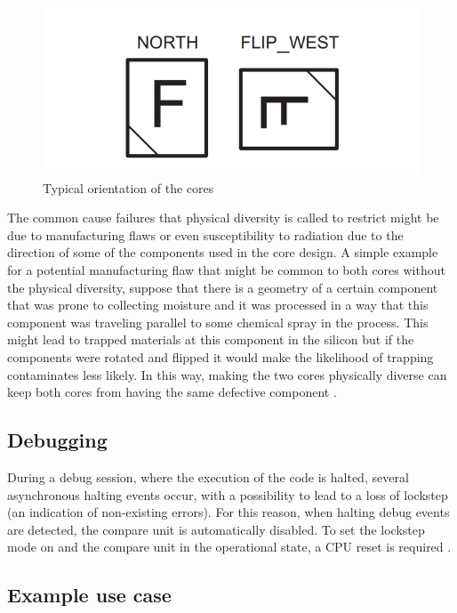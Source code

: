 \begin{figure}[H]

      \centering
      \includegraphics[width=0.8\linewidth]{images/lockstep_cpu_position.png}
      \caption{Typical orientation of the cores \citep{safety_maual_tms570ls31x}}
      \label{fig:lockstep_cpu_position}
    
\end{figure}

The common cause failures
that physical diversity is called to restrict might be due to manufacturing flaws
or even susceptibility to radiation due to the direction of some of the components
used in the core design. A simple example for a potential manufacturing flaw that
might be common to both cores without the physical diversity, suppose that there
is a geometry of a certain component that was prone to collecting moisture and it was processed in a way that this component was traveling parallel to some chemical spray in the process. This might lead to trapped materials at this component
in the silicon but if the components were rotated and flipped it would make the
likelihood of trapping contaminates less likely. In this way, making the two cores
physically diverse can keep both cores from having the same defective component \citep{lockstep_analysis}. 

\subsection{Debugging}

During a debug session, where the execution of the code is halted, several asynchronous halting events occur, with a possibility to lead to a loss of lockstep (an indication of non-existing errors). For this reason, when halting debug events are
detected, the compare unit is automatically disabled. To set the lockstep
mode on and the compare unit in the operational state, a CPU reset is required  \citep{TMS570LS31x21x_manual}.

\subsection{Example use case}

